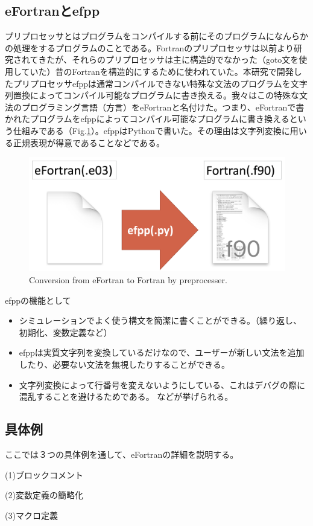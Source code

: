 \documentclass[12pt]{jsarticle}
\begin{document}
\subsection{eFortranとefpp}
プリプロセッサとはプログラムをコンパイルする前にそのプログラムになんらかの処理をするプログラムのことである。Fortranのプリプロセッサは以前より研究されてきた\cite{kernighan1975ratfor}\cite{tsuji1988structured}が、それらのプリプロセッサは主に構造的でなかった（goto文を使用していた）昔のFortranを構造的にするために使われていた。本研究で開発したプリプロセッサefppは通常コンパイルできない特殊な文法のプログラムを文字列置換によってコンパイル可能なプログラムに書き換える。我々はこの特殊な文法のプログラミング言語（方言）をeFortranと名付けた。つまり、eFortranで書かれたプログラムをefppによってコンパイル可能なプログラムに書き換えるという仕組みである（Fig.\ref{conversion}）。efppはPythonで書いた。その理由は文字列変換に用いる正規表現が得意であることなどである。

\begin{figure}[H]
\centering
\includegraphics[height=0.5\textheight,width=1.0\hsize,angle=0,keepaspectratio]{./Image/conversion.png}
\caption{Conversion from eFortran to Fortran by preprocesser.} \label{conversion}
\end{figure}


efppの機能として
\begin{itemize}
\item シミュレーションでよく使う構文を簡潔に書くことができる。（繰り返し、初期化、変数定義など）
\item efppは実質文字列を変換しているだけなので、ユーザーが新しい文法を追加したり、必要ない文法を無視したりすることができる。
\item 文字列変換によって行番号を変えないようにしている、これはデバグの際に混乱することを避けるためである。
などが挙げられる。
\end{itemize}

\subsection{具体例}
ここでは３つの具体例を通して、eFortranの詳細を説明する。
\begin{description}
\item{(1)}ブロックコメント
\item{(2)}変数定義の簡略化
\item{(3)}マクロ定義
\end{description}
\end{document}
